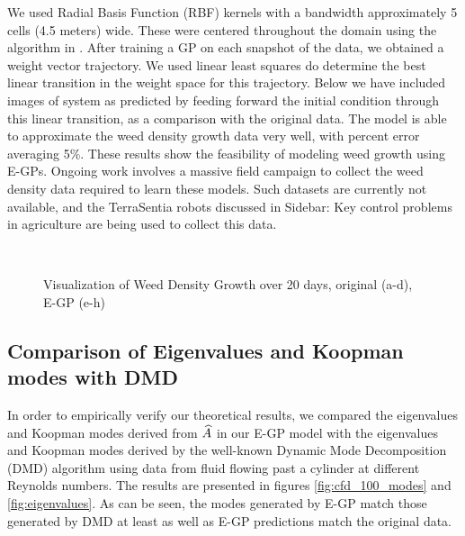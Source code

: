 We used Radial Basis Function (RBF) kernels with a bandwidth approximately 5 cells (4.5 meters) wide. These were centered throughout the domain using the algorithm in \cite{csato2001sparse}. After training a GP on each snapshot of the data, we obtained a weight vector trajectory. We used linear least squares do determine the best linear transition in the weight space for this trajectory. Below we have included images of system as predicted by feeding forward the initial condition through this linear transition, as a comparison with the original data. The model is able to approximate the weed density growth data very well, with percent error averaging 5\%. These results show the feasibility of modeling weed growth using E-GPs. Ongoing work involves a massive field campaign to collect the weed density data required to learn these models. Such datasets are currently not available, and the TerraSentia robots discussed in Sidebar: Key control problems in agriculture are being used to collect this data.

\begin{figure*}[h] %
	\centering
	\\
	
	\caption{Visualization of Weed Density Growth over 20 days, original (a-d), E-GP (e-h)}
	\label{fig:weed_egp}
\end{figure*}






\subsection{Comparison of Eigenvalues and Koopman modes with DMD}

In order to empirically verify our theoretical results, we compared the eigenvalues and Koopman modes derived from $\widehat{A}$ in our E-GP model with the eigenvalues and Koopman modes derived by the well-known Dynamic Mode Decomposition (DMD) algorithm using data from fluid flowing past a cylinder at different Reynolds numbers. The results are presented in figures \ref{fig:cfd_100_modes} and \ref{fig:eigenvalues}. As can be seen, the modes generated by E-GP match those generated by DMD at least as well as E-GP predictions match the original data.


